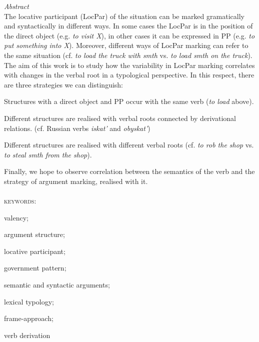 
\usepackage{alltt}
\usepackage{bibunits}
\usepackage{enumitem}
\usepackage{ltablex,booktabs}



\begin{changemargin}{20mm}{5mm}
\textit{Abstract}\\
The locative participant (LocPar) of the situation can be marked gramatically and syntactically in different ways. In some cases the LocPar is in the position of the direct object (e.g. \textit{to visit X}), in other cases it can be expressed in PP (e.g. \textit{to put something into X}). Moreover, different ways of LocPar marking can refer to the same situation (cf. \textit{to load the truck with smth} vs. \textit{to load smth on the truck}). The aim of this work is to study how the variability in LocPar marking correlates with changes in the verbal root in a typological perspective. In this respect, there are three strategies we can distinguish:
\begin{enumerate*}[label=(\arabic*),itemjoin={\hskip3mm},after=\hskip3mm,before=\hskip3mm]
    \item Structures with a direct object and PP occur with the same verb (\textit{to load} above).
    \item Different structures are realised with verbal roots connected by derivational relations. (cf. Russian verbs \textit{iskat'} and \textit{obyskat'})
    \item Different structures are realised with different verbal roots (cf. \textit{to rob the shop} vs. \textit{to steal smth from the shop}).
\end{enumerate*}
Finally, we hope to observe correlation between the semantics of the verb and the strategy of argument marking, realised with it.\\
\\
\textsc{keywords}:\\
\begin{enumerate*}[label=,itemjoin={\hskip4mm},after=\hskip4mm,before=\hskip4mm]
\item valency;
\item argument structure;
\item locative participant;
\item government pattern;
\item semantic and syntactic arguments;
\item lexical typology;
\item frame-approach;
\item verb derivation

\end{enumerate*}
\end{changemargin}
\normalsize

